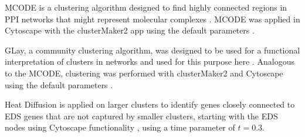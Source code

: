 \begin{description}[leftmargin=5pt]
	\begin{description}[leftmargin=0pt]
		\item[MCODE]MCODE is a clustering algorithm designed to find highly connected regions in PPI networks that might represent molecular complexes \cite{mcode}. MCODE was applied in Cytoscape with the clusterMaker2 app using the default parameters \cite{Cytoscape, clusterMaker2}.
		
		\item[Community Clustering]GLay, a community clustering algorithm, was designed to be used for a functional interpretation of clusters in networks and used for this purpose here \cite{GLay}. Analogous to the MCODE, clustering was performed with clusterMaker2 and Cytoscape using the default parameters \cite{Cytoscape, clusterMaker2}.
		
		Heat Diffusion is applied on larger clusters to identify genes closely connected to EDS genes that are not captured by smaller clusters, starting with the EDS nodes using Cytoscape functionality \cite{heatDiffusion}, using a time parameter of $t=0.3$.
	\end{description}
\end{description}


